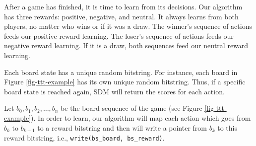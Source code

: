 
After a game has finished, it is time to learn from its decisions. Our algorithm has three rewards: positive, negative, and neutral. It always learns from both players, no matter who wins or if it was a draw. The winner's sequence of actions feeds our positive reward learning. The loser's sequence of actions feeds our negative reward learning. If it is a draw, both sequences feed our neutral reward learning.

Each board state has a unique random bitstring. For instance, each board in Figure \ref{fig-ttt-example} has its own unique random bitstring. Thus, if a specific board state is reached again, SDM will return the scores for each action.

Let $b_0, b_1, b_2, \dots, b_n$ be the board sequence of the game (see Figure \ref{fig-ttt-example}). In order to learn, our algorithm will map each action which goes from $b_k$ to $b_{k+1}$ to a reward bitstring and then will write a pointer from $b_k$ to this reward bitstring, i.e., \lstinline{write(bs_board, bs_reward)}.

